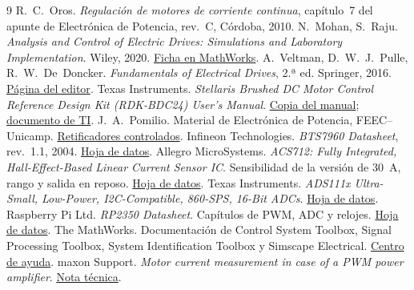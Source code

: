 \documentclass[11pt,a4paper]{article}
\begin{document}
\begin{thebibliography}{9}
 R.~C.~Oros. \textit{Regulación de motores de corriente continua}, capítulo~7 del apunte de Electrónica de Potencia, rev.~C, Córdoba, 2010.
 N.~Mohan, S.~Raju. \textit{Analysis and Control of Electric Drives: Simulations and Laboratory Implementation}. Wiley, 2020. \href{https://ch.mathworks.com/academia/books/analysis-and-control-of-electric-drives-mohan.html}{Ficha en MathWorks}.
 A.~Veltman, D.~W.~J.~Pulle, R.~W.~De~Doncker. \textit{Fundamentals of Electrical Drives}, 2.ª ed. Springer, 2016. \href{https://www.springer.com/9783319200422}{Página del editor}.
 Texas Instruments. \textit{Stellaris Brushed DC Motor Control Reference Design Kit (RDK-BDC24) User's Manual}. \href{https://wiki.penfieldrobotics.com/wiki/images/e/e7/BDC24_RDK_UM.pdf}{Copia del manual}; \href{https://www.ti.com/lit/pdf/spmu133}{documento de TI}.
 J.~A.~Pomilio. Material de Electrónica de Potencia, FEEC--Unicamp. \href{https://site.fee.unicamp.br/sites/default/files/uploads/antenor/apres_retif_controlad.pdf}{Retificadores controlados}.
 Infineon Technologies. \textit{BTS7960 Datasheet}, rev.~1.1, 2004. \href{https://www.infineon.com/assets/row/public/documents/10/57/infineon-bts7960-ds-en.pdf}{Hoja de datos}.
 Allegro MicroSystems. \textit{ACS712: Fully Integrated, Hall-Effect-Based Linear Current Sensor IC}. Sensibilidad de la versión de 30~A, rango y salida en reposo. \href{https://www.allegromicro.com/-/media/files/datasheets/acs712-datasheet.pdf}{Hoja de datos}.
 Texas Instruments. \textit{ADS111x Ultra-Small, Low-Power, I2C-Compatible, 860-SPS, 16-Bit ADCs}. \href{https://www.ti.com/lit/ds/symlink/ads1115.pdf}{Hoja de datos}.
 Raspberry Pi Ltd. \textit{RP2350 Datasheet}. Capítulos de PWM, ADC y relojes. \href{https://datasheets.raspberrypi.com/rp2350/rp2350-datasheet.pdf}{Hoja de datos}.
 The MathWorks. Documentación de Control System Toolbox, Signal Processing Toolbox, System Identification Toolbox y Simscape Electrical. \href{https://www.mathworks.com/help/}{Centro de ayuda}.
 maxon Support. \textit{Motor current measurement in case of a PWM power amplifier}. \href{https://support.maxongroup.com/hc/en-us/articles/360012273994-Motor-current-measurement-in-case-of-a-PWM-power-amplifier}{Nota técnica}.
\end{thebibliography}
\end{document}
